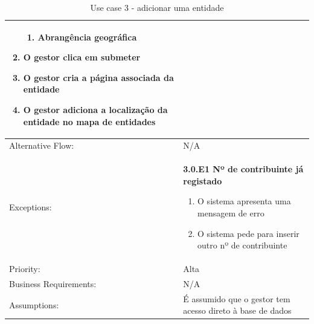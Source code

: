 \documentclass{scrreprt}
\begin{document}
\begin{table}[H]
\begin{adjustbox}{width=1.15\textwidth,center=\textwidth}
\begin{tabular}{|m{4cm}|m{12cm}|}
\begin{enumerate}
\begin{enumerate}
                    \item Abrangência geográfica
                \end{enumerate}
                \item O gestor clica em submeter
                \item O gestor cria a página associada da entidade
                \item O gestor adiciona  a localização da entidade no mapa de entidades
            \end{enumerate} \\
            \hline
            Alternative Flow: & N/A \\
            \hline
            Exceptions: & \textbf{3.0.E1  Nº de contribuinte já registado}
            \begin{enumerate}
                \item O sistema apresenta uma mensagem de erro
                \item O sistema pede para inserir outro nº de contribuinte
            \end{enumerate} \\
            \hline
            Priority: & Alta \\
            \hline
            Business Requirements: & N/A \\
            \hline
            Assumptions: & É assumido que o gestor tem acesso direto à base de dados \\
            \hline
        \end{tabular}
    \end{adjustbox}
    \caption{Use case 3 - adicionar uma entidade}
    \label{use case 3}
\end{table}
\end{document}
